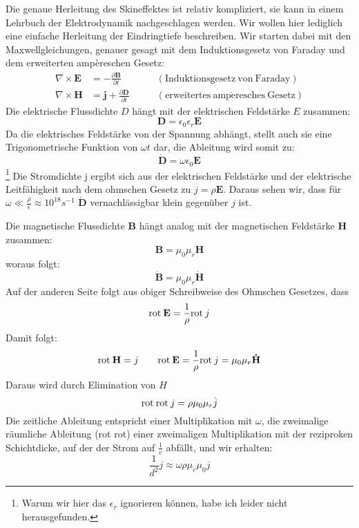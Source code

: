 Die genaue Herleitung des Skineffektes ist relativ kompliziert, sie kann in einem Lehrbuch der Elektrodynamik nachgeschlagen werden. %
Wir wollen hier lediglich eine einfache Herleitung der Eindringtiefe beschreiben.
Wir starten dabei mit den Maxwellgleichungen, genauer gesagt mit dem Induktionsgesetz von Faraday und dem erweiterten ampèreschen Gesetz:
\begin{align}
\nabla \times \mathbf{E} &= -\frac{\partial \mathbf{B}}{\partial t} \qquad &\mathrm{(Induktionsgesetz\ von\ Faraday)} \\
\nabla \times \mathbf{H} &= \mathbf{j} + \frac{\partial \mathbf{D}}{\partial t} \qquad &\mathrm{(erweitertes\ amp\grave{e}resches\ Gesetz)}
\end{align}
Die elektrische Flussdichte $D$ hängt mit der elektrischen Feldstärke $E$ zusammen:
\begin{equation}
\mathbf D = \epsilon_0 \epsilon_r \mathbf{E}
\end{equation}
Da die elektrisches Feldstärke von der Spannung abhängt, stellt auch sie eine Trigonometrische Funktion von $\omega t$ dar, die Ableitung wird somit zu:
\begin{equation}
\mathbf{\dot{D}} = \omega \epsilon_0 \mathbf{E}
\end{equation}\footnote{Warum wir hier das $\epsilon_r$ ignorieren können, habe ich leider nicht herausgefunden.}
Die Stromdichte j ergibt sich aus der elektrischen Feldstärke und der elektrische Leitfähigkeit nach dem ohmschen Gesetz zu $j = \rho \mathbf E$. Daraus sehen wir, dass für $\omega \ll \frac{\rho}{\epsilon} \approx 10^{18} s^{-1}$ $\mathbf{\dot{D}}$ vernachlässigbar klein gegenüber $j$ ist.

Die magnetische Flussdichte $\mathbf B$ hängt analog mit der magnetischen Feldstärke $\mathbf H$ zusammen:
\begin{equation}
\mathbf B = \mu_0 \mu_r \mathbf H
\end{equation} 
woraus folgt:
\begin{equation}
\mathbf{\dot{B}} = \mu_0 \mu_r \mathbf{\dot{H}}
\end{equation} 
Auf der anderen Seite folgt aus obiger Schreibweise des Ohmschen Gesetzes, dass 
\begin{equation}
\mathrm{rot\:} \mathbf E = \frac{1}{\rho} \mathrm{rot\:} j
\end{equation}
Damit folgt:
\begin{equation}
\mathrm{rot\:} \mathbf H = j \qquad
\mathrm{rot\:} \mathbf E = \frac{1}{\rho} \mathrm{rot\:} j = \mu_0 \mu_r \mathbf{\dot{H}}
\end{equation}
Daraus wird durch Elimination von $H$
\begin{equation}
\mathrm{rot\:}\mathrm{rot\:} j = \rho \mu_0 \mu_r \dot{j}
\end{equation}
Die zeitliche Ableitung entspricht einer Multiplikation mit $\omega$, die zweimalige räumliche Ableitung (rot rot) einer zweimaligen Multiplikation mit der reziproken Schichtdicke, auf der der Strom auf $\frac{1}{e}$ abfällt, und wir erhalten:
\begin{equation}
\frac{1}{d^2} j \approx \omega \rho \mu_r \mu_0 j
\end{equation}

